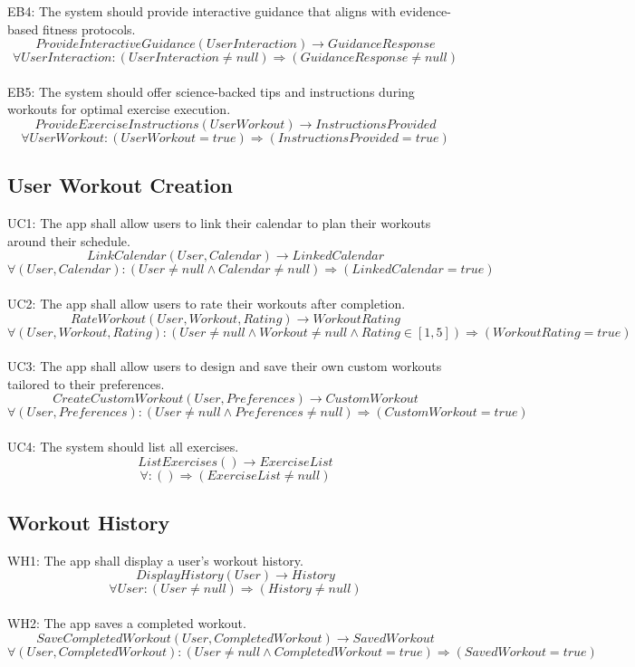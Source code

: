 \documentclass[12pt]{article}
\begin{document}
EB4: The system should provide interactive guidance that aligns with evidence-based fitness protocols.
\[ProvideInteractiveGuidance(UserInteraction) \rightarrow GuidanceResponse \]
\[ \forall UserInteraction: (UserInteraction \neq null) \Rightarrow (GuidanceResponse \neq null) \]\\

EB5: The system should offer science-backed tips and instructions during workouts for optimal exercise execution.
\[ProvideExerciseInstructions(UserWorkout) \rightarrow InstructionsProvided \]
\[ \forall UserWorkout: (UserWorkout = true) \Rightarrow (InstructionsProvided = true) \]

\subsection{User Workout Creation}
UC1: The app shall allow users to link their calendar to plan their workouts around their schedule.
\[LinkCalendar(User, Calendar) \rightarrow LinkedCalendar \]
\[ \forall (User, Calendar): (User \neq null \land Calendar \neq null) \Rightarrow (LinkedCalendar = true) \]
\\

UC2: The app shall allow users to rate their workouts after completion.
\[RateWorkout(User, Workout, Rating) \rightarrow WorkoutRating \]
\[ \forall (User, Workout, Rating):(User \neq null \land Workout \neq null \land Rating \in [1,5]) \Rightarrow (WorkoutRating = true) \]\\

UC3: The app shall allow users to design and save their own custom workouts tailored to their preferences.
\[CreateCustomWorkout(User, Preferences) \rightarrow CustomWorkout \]
\[ \forall (User, Preferences):(User \neq null \land Preferences \neq null) \Rightarrow (CustomWorkout = true) \]\\

UC4: The system should list all exercises.
\[ListExercises() \rightarrow ExerciseList \]
\[ \forall : () \Rightarrow (ExerciseList \neq null) \]

\subsection{Workout History}
WH1: The app shall display a user’s workout history.
\[DisplayHistory(User) \rightarrow History \]
\[ \forall User: (User \neq null) \Rightarrow (History \neq null) \]\\

WH2: The app saves a completed workout.
\[SaveCompletedWorkout(User, CompletedWorkout) \rightarrow SavedWorkout \]
\[ \forall (User, CompletedWorkout): (User \neq null \land CompletedWorkout = true) \Rightarrow (SavedWorkout = true) \]
\end{document}
